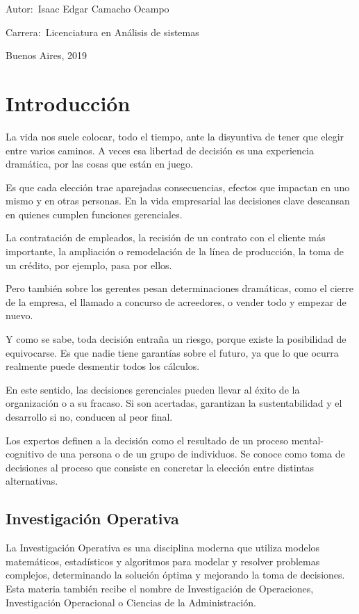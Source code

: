 \documentclass[12pt]{book}
\begin{document}
\noindent Autor:	\,Isaac Edgar Camacho Ocampo
 
\noindent Carrera:	\,Licenciatura en An\'alisis de sistemas

\vspace{1cm}

\vspace{1cm}

\noindent Buenos Aires, 2019

\newpage

\tableofcontents

\chapter{Introducci\'on}La vida nos suele colocar, todo el tiempo, ante la disyuntiva de tener que elegir entre varios caminos. A veces esa libertad de decisión es una experiencia dramática, por las cosas que están en juego.

Es que cada elección trae aparejadas consecuencias, efectos que impactan en uno mismo y en otras personas. En la vida empresarial las decisiones clave descansan en quienes cumplen funciones gerenciales.

La contratación de empleados, la recisión de un contrato con el cliente más importante, la ampliación o remodelación de la línea de producción, la toma de un crédito, por ejemplo, pasa por ellos.

Pero también sobre los gerentes pesan determinaciones dramáticas, como el cierre de la empresa, el llamado a concurso de acreedores, o vender todo y empezar de nuevo.

Y como se sabe, toda decisión entraña un riesgo, porque existe la posibilidad de equivocarse. Es que nadie tiene garantías sobre el futuro, ya que lo que ocurra realmente puede desmentir todos los cálculos.

En este sentido, las decisiones gerenciales pueden llevar al éxito de la organización o a su fracaso. Si son acertadas, garantizan la sustentabilidad y el desarrollo si no, conducen al peor final.

Los expertos definen a la decisión como el resultado de un proceso mental-cognitivo de una persona o de un grupo de individuos. Se conoce como toma de decisiones al proceso que consiste en concretar la elección entre distintas alternativas.
\section{Investigación Operativa}
La Investigación Operativa es una disciplina moderna que utiliza modelos matemáticos, estadísticos y algoritmos para modelar y resolver problemas complejos, determinando la solución óptima y mejorando la toma de decisiones. Esta materia también recibe el nombre de Investigación de Operaciones, Investigación Operacional o Ciencias de la Administración.
\end{document}
